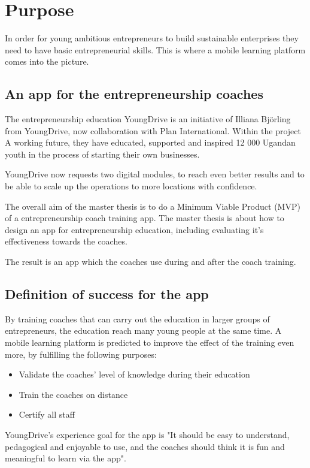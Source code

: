 \section{Purpose}
\label{purpose}

In order for young ambitious entrepreneurs to build sustainable enterprises they need to have basic entrepreneurial skills. This is where a mobile learning platform comes into the picture.

\subsection{An app for the entrepreneurship coaches}
The entrepreneurship education YoungDrive is an initiative of Illiana Björling from YoungDrive, now collaboration with Plan International. Within the project A working future, they have educated, supported and inspired 12 000 Ugandan youth in the process of starting their own businesses. \citep{nissar}

YoungDrive now requests two digital modules, to reach even better results and to be able to scale up the operations to more locations with confidence.

The overall aim of the master thesis is to do a Minimum Viable Product (MVP) of a entrepreneurship coach training app. The master thesis is about how to design an app for entrepreneurship education, including evaluating it's effectiveness towards the coaches.

The result is an app which the coaches use during and after the coach training.

\subsection{Definition of success for the app}

By training coaches that can carry out the education in larger groups of entrepreneurs, the education reach many young people at the same time. A mobile learning platform is predicted to improve the effect of the training even more, by fulfilling the following purposes:

\begin{itemize}
  \item Validate the coaches' level of knowledge during their education
    \item Train the coaches on distance
    \item Certify all staff
\end{itemize}

YoungDrive's experience goal for the app is "It should be easy to understand, pedagogical and enjoyable to use, and the coaches should think it is fun and meaningful to learn via the app". \citep{youngdrive-masterthesis-idea}
